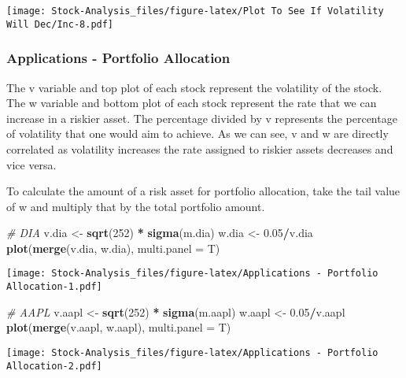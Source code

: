\documentclass[
]{article}
\newenvironment{Shaded}{\begin{snugshade}}{\end{snugshade}}
\newcommand{\CommentTok}[1]{\textcolor[rgb]{0.56,0.35,0.01}{\textit{#1}}}
\newcommand{\DataTypeTok}[1]{\textcolor[rgb]{0.13,0.29,0.53}{#1}}
\newcommand{\DecValTok}[1]{\textcolor[rgb]{0.00,0.00,0.81}{#1}}
\newcommand{\FloatTok}[1]{\textcolor[rgb]{0.00,0.00,0.81}{#1}}
\newcommand{\KeywordTok}[1]{\textcolor[rgb]{0.13,0.29,0.53}{\textbf{#1}}}
\newcommand{\NormalTok}[1]{#1}
\newcommand{\OperatorTok}[1]{\textcolor[rgb]{0.81,0.36,0.00}{\textbf{#1}}}
\newcommand{\StringTok}[1]{\textcolor[rgb]{0.31,0.60,0.02}{#1}}
\begin{document}
\texttt{[image: Stock-Analysis\_files/figure-latex/Plot To See If Volatility Will Dec/Inc-8.pdf]}

\hypertarget{applications---portfolio-allocation}{%
\subsubsection{Applications - Portfolio
Allocation}\label{applications---portfolio-allocation}}

The v variable and top plot of each stock represent the volatility of
the stock. The w variable and bottom plot of each stock represent the
rate that we can increase in a riskier asset. The percentage divided by
v represents the percentage of volatility that one would aim to achieve.
As we can see, v and w are directly correlated as volatility increases
the rate assigned to riskier assets decreases and vice versa.

To calculate the amount of a risk asset for portfolio allocation, take
the tail value of w and multiply that by the total portfolio amount.

\begin{Shaded}
\begin{Highlighting}[]
\CommentTok{# DIA}
\NormalTok{v.dia <-}\StringTok{ }\KeywordTok{sqrt}\NormalTok{(}\DecValTok{252}\NormalTok{) }\OperatorTok{*}\StringTok{ }\KeywordTok{sigma}\NormalTok{(m.dia)}
\NormalTok{w.dia <-}\StringTok{ }\FloatTok{0.05}\OperatorTok{/}\NormalTok{v.dia}
\KeywordTok{plot}\NormalTok{(}\KeywordTok{merge}\NormalTok{(v.dia, w.dia),}
     \DataTypeTok{multi.panel =}\NormalTok{ T)}
\end{Highlighting}
\end{Shaded}

\texttt{[image: Stock-Analysis\_files/figure-latex/Applications - Portfolio Allocation-1.pdf]}

\begin{Shaded}
\begin{Highlighting}[]
\CommentTok{# AAPL}
\NormalTok{v.aapl <-}\StringTok{ }\KeywordTok{sqrt}\NormalTok{(}\DecValTok{252}\NormalTok{) }\OperatorTok{*}\StringTok{ }\KeywordTok{sigma}\NormalTok{(m.aapl)}
\NormalTok{w.aapl <-}\StringTok{ }\FloatTok{0.05}\OperatorTok{/}\NormalTok{v.aapl}
\KeywordTok{plot}\NormalTok{(}\KeywordTok{merge}\NormalTok{(v.aapl, w.aapl),}
     \DataTypeTok{multi.panel =}\NormalTok{ T)}
\end{Highlighting}
\end{Shaded}

\texttt{[image: Stock-Analysis\_files/figure-latex/Applications - Portfolio Allocation-2.pdf]}
\end{document}
